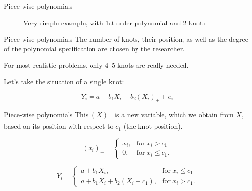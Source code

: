 \documentclass[12pt,english,pdf,xcolor=dvipsnames,aspectratio=169,handout]{beamer}\usepackage[]{graphicx}\usepackage[]{xcolor}
\begin{document}
\begin{frame}[fragile]{Piece-wise polynomials}
\begin{figure}
\caption{Very simple example, with 1st order polynomial and 2 knots}
\end{figure}

\end{frame}



\begin{frame}{Piece-wise polynomials}
The number of knots, their position, as well as the degree of the polynomial specification are chosen by the researcher.\bigskip

For most realistic problems, only 4--5 knots are really needed.\bigskip

Let's take the situation of a single knot:

\begin{equation}
Y_i = a + b_1X_i + b_2(X_i)_+ + e_i
\end{equation}
\end{frame}




\begin{frame}{Piece-wise polynomials}
  This $(X)_+$ is a new variable, which we obtain from $X$, based on its position with respect to $c_1$ (the knot position).\bigskip

  \begin{equation}
    (x_i)_+ = \begin{cases}
         x_i, & \text{for}\ x_i > c_1 \\
           0, & \text{for}\ x_i \leq c_1.      
      \end{cases}
    \end{equation}

    \begin{equation}
    Y_i = \begin{cases}
         a + b_1X_i, & \text{for}\ x_i \leq c_1 \\
         a + b_1X_i + b_2(X_i - c_1), & \text{for}\ x_i > c_1.      
      \end{cases}
    \end{equation}
  
\end{frame}
\end{document}
